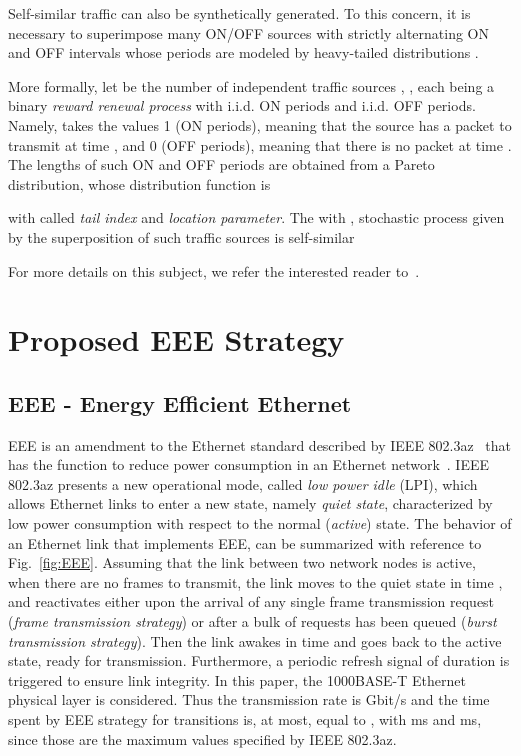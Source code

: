 \documentclass[journal,10pt,twoside,final]{IEEEtran}
\begin{document}
Self-similar traffic can also be synthetically generated. To this concern, it is necessary to superimpose many ON/OFF sources with strictly alternating ON and OFF intervals whose periods are modeled by heavy-tailed distributions \cite{TaqquWillingerSherman97}.

More formally, let  be the number of independent traffic sources , , each being a binary \textit{reward renewal process} with i.i.d. ON periods and i.i.d. OFF periods. Namely,  takes the values 1 (ON periods), meaning that the source has a packet to transmit at time , and 0 (OFF periods), meaning that there is no packet at time . The lengths  of such ON and OFF periods are obtained from a Pareto distribution, whose distribution function is 

with  called \emph{tail index} and  \emph{location parameter}.
The  with , stochastic process given by the superposition of such traffic sources is self-similar
 
For more details on this subject, we refer the interested reader to~\cite{TaqquWillingerSherman97}.

\section{Proposed EEE Strategy}
\label{sec:selfSimilarTrafficShaping}
\subsection{EEE - Energy Efficient Ethernet}

EEE is an amendment to the Ethernet standard described by IEEE 802.3az~\cite{eee} that has the function to reduce power consumption in an Ethernet network~\cite{ChristensenReviriegoNordman10}. 
IEEE 802.3az presents a new operational mode, called \textit{low power idle} (LPI), which allows Ethernet links to enter a new state, namely \emph{quiet state}, characterized by low power consumption with respect to the normal (\emph{active}) state. 
The behavior of an Ethernet link that implements EEE, can be summarized with reference to Fig.~\ref{fig:EEE}.
Assuming that the link between two network nodes is active, when there are no frames to transmit, the link moves to the quiet state in time , and reactivates either upon the arrival of any single frame transmission request (\emph{frame transmission strategy}) or after a bulk of requests has been queued (\emph{burst transmission strategy}).
Then the link awakes in time  and goes back to the active state, ready for transmission. Furthermore, a periodic refresh signal of duration  is triggered to ensure link integrity. 
In this paper, the 1000BASE-T Ethernet physical layer is considered. Thus the transmission rate is  Gbit/s and the time spent by EEE strategy for transitions is, at most, equal to , with  ms and  ms, since those are the maximum values specified by IEEE 802.3az.
\end{document}
